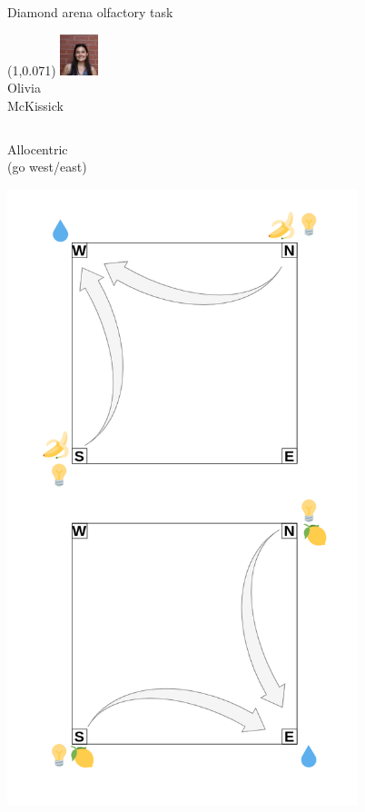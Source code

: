 \documentclass[bigger]{beamer}
\begin{document}
\begin{frame}[label={sec:org21e64f9}]{Diamond arena olfactory task}
\begin{textblock}{0.2}(1,0.071)%
\center%
\includegraphics[width=3em]{img/olivia.jpg}\\
\scriptsize
Olivia\\McKissick
\end{textblock}
\begin{columns}
\begin{column}[t]{0.5\columnwidth}
\center
\vspace{-2em}
Allocentric\\
(go west/east)
\vspace{-1.5em}
\begin{center}
\includegraphics[width=0.8\textwidth]{img/RL_env-allo-task.drawio.png}
\end{center}
\end{column}
\begin{column}[t]{0.5\columnwidth}
\end{column}
\end{columns}
\end{frame}
\end{document}
